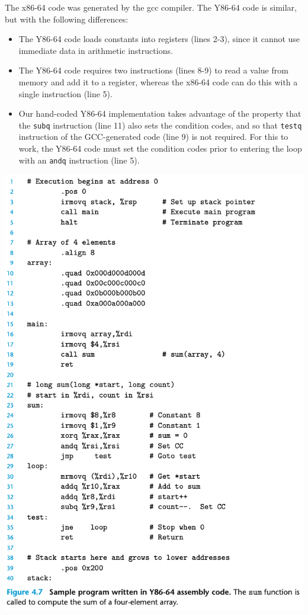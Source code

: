 \documentclass[11pt]{article}
\begin{document}
The x86-64 code was generated by the gcc compiler. The Y86-64 code is similar, but with the following differences:\\
\begin{itemize}
\item The Y86-64 code loads constants into registers (lines 2-3), since it cannot use immediate data in arithmetic instructions.\\
\item The Y86-64 code requires two instructions (lines 8-9) to read a value from memory and add it to a register, whereas the x86-64 code can do this with a single instruction (line 5).\\
\item Our hand-coded Y86-64 implementation takes advantage of the property that the \texttt{subq} instruction (line 11) also sets the condition codes, and so that \texttt{testq} instruction of the GCC-generated code (line 9) is not required. For this to work, the Y86-64 code must set the condition codes prior to entering the loop with an \texttt{andq} instruction (line 5).\\
\end{itemize}


\begin{center}
\includegraphics[width=.9\linewidth]{pics/figure4.7-sample-program-written-in-y86-64-assembly-code.png}
\end{center}
\end{document}
